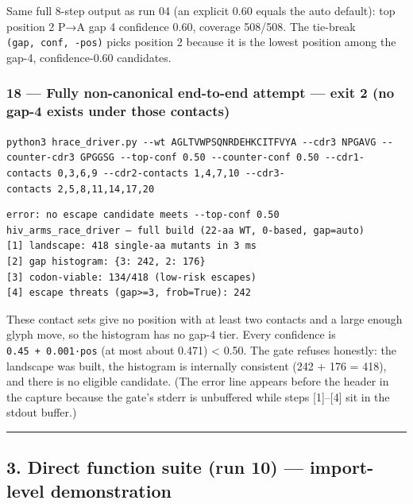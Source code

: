\documentclass[12pt,a4paper]{article}
\begin{document}
Same full 8-step output as run 04 (an explicit 0.60 equals the auto
default): top position 2 P→A gap 4 confidence 0.60, coverage 508/508.
The tie-break \texttt{(gap,\ conf,\ -pos)} picks position 2 because it
is the lowest position among the gap-4, confidence-0.60 candidates.

\hypertarget{fully-non-canonical-end-to-end-attempt-exit-2-no-gap-4-exists-under-those-contacts}{%
\subsubsection{18 --- Fully non-canonical end-to-end attempt --- exit 2
(no gap-4 exists under those
contacts)}\label{fully-non-canonical-end-to-end-attempt-exit-2-no-gap-4-exists-under-those-contacts}}

\texttt{python3\ hrace\_driver.py\ -\/-wt\ AGLTVWPSQNRDEHKCITFVYA\ -\/-cdr3\ NPGAVG\ -\/-counter-cdr3\ GPGGSG\ -\/-top-conf\ 0.50\ -\/-counter-conf\ 0.50\ -\/-cdr1-contacts\ 0,3,6,9\ -\/-cdr2-contacts\ 1,4,7,10\ -\/-cdr3-contacts\ 2,5,8,11,14,17,20}

\begin{verbatim}
error: no escape candidate meets --top-conf 0.50
hiv_arms_race_driver — full build (22-aa WT, 0-based, gap=auto)
[1] landscape: 418 single-aa mutants in 3 ms
[2] gap histogram: {3: 242, 2: 176}
[3] codon-viable: 134/418 (low-risk escapes)
[4] escape threats (gap>=3, frob=True): 242
\end{verbatim}

These contact sets give no position with at least two contacts and a
large enough glyph move, so the histogram has no gap-4 tier. Every
confidence is \texttt{0.45\ +\ 0.001·pos} (at most about 0.471)
\textless{} 0.50. The gate refuses honestly: the landscape was built,
the histogram is internally consistent (242 + 176 = 418), and there is
no eligible candidate. (The error line appears before the header in the
capture because the gate's stderr is unbuffered while steps
{[}1{]}--{[}4{]} sit in the stdout buffer.)

\begin{center}\rule{0.5\linewidth}{0.5pt}\end{center}

\hypertarget{direct-function-suite-run-10-import-level-demonstration}{%
\subsection{3. Direct function suite (run 10) --- import-level
demonstration}\label{direct-function-suite-run-10-import-level-demonstration}}
\end{document}
